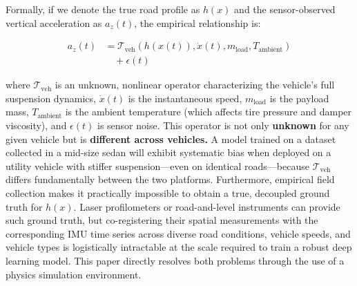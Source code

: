 \documentclass[conference]{IEEEtran}
\begin{document}
Formally, if we denote the true road profile as $h(x)$ and the sensor-observed vertical acceleration as $a_z(t)$, the empirical relationship is:

\begin{equation}
\begin{split}
a_z(t) &= \mathcal{T}_{\text{veh}}(h(x(t)), \dot{x}(t), m_{\text{load}}, T_{\text{ambient}}) \\
&\quad + \epsilon(t)
\end{split}
\end{equation}

where $\mathcal{T}_{\text{veh}}$ is an unknown, nonlinear operator characterizing the vehicle's full suspension dynamics, $\dot{x}(t)$ is the instantaneous speed, $m_{\text{load}}$ is the payload mass, $T_{\text{ambient}}$ is the ambient temperature (which affects tire pressure 
and damper viscosity), and $\epsilon(t)$ is sensor noise. This operator is not only \textbf{unknown} for any given vehicle but is \textbf{different across vehicles.} A model trained on a dataset collected in a mid-size sedan will exhibit systematic bias when deployed on a utility vehicle with stiffer suspension---even on identical roads---because $\mathcal{T}_{\text{veh}}$ differs fundamentally between the two platforms.
Furthermore, empirical field collection makes it practically impossible to obtain a true, decoupled ground truth for $h(x)$.
Laser profilometers or road-and-level instruments can provide such ground truth, but co-registering their spatial measurements with the corresponding IMU time series across diverse road conditions, vehicle speeds, and vehicle types is logistically intractable at the scale required to train a robust deep learning model.
This paper directly resolves both problems through the use of a physics simulation environment.
\end{document}
